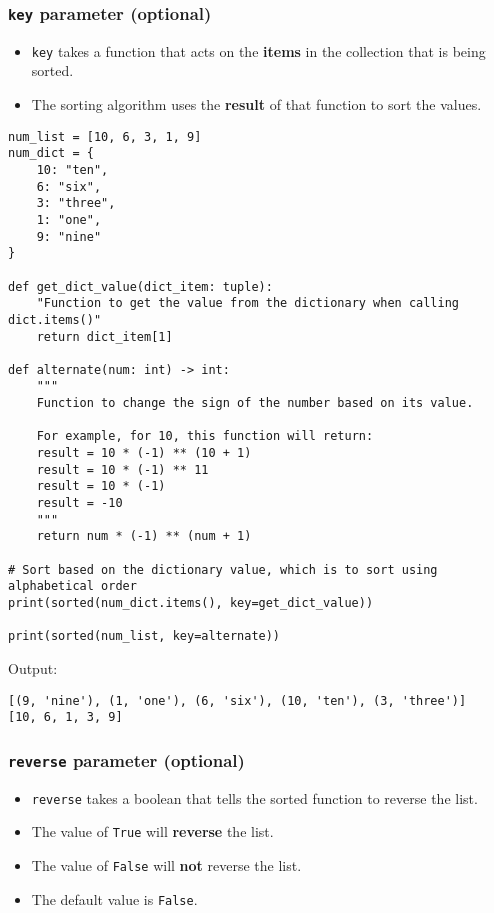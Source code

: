 \documentclass[11pt]{article}
\begin{document}
 \newpage

\subsubsection{\texttt{key} parameter (optional)}
\label{sec:org59bed96}
\begin{itemize}
\item \texttt{key} takes a function that acts on the \textbf{items} in the collection that is being sorted.
\item The sorting algorithm uses the \textbf{result} of that function to sort the values.
\end{itemize}

\begin{verbatim}
num_list = [10, 6, 3, 1, 9]
num_dict = {
    10: "ten",
    6: "six",
    3: "three",
    1: "one",
    9: "nine"
}

def get_dict_value(dict_item: tuple):
    "Function to get the value from the dictionary when calling dict.items()"
    return dict_item[1]

def alternate(num: int) -> int:
    """
    Function to change the sign of the number based on its value.

    For example, for 10, this function will return:
    result = 10 * (-1) ** (10 + 1)
    result = 10 * (-1) ** 11
    result = 10 * (-1)
    result = -10
    """
    return num * (-1) ** (num + 1)

# Sort based on the dictionary value, which is to sort using alphabetical order
print(sorted(num_dict.items(), key=get_dict_value))

print(sorted(num_list, key=alternate))
\end{verbatim}

 \noindent Output:

\begin{verbatim}
[(9, 'nine'), (1, 'one'), (6, 'six'), (10, 'ten'), (3, 'three')]
[10, 6, 1, 3, 9]
\end{verbatim}

\subsubsection{\texttt{reverse} parameter (optional)}
\label{sec:org70cd256}
\begin{itemize}
\item \texttt{reverse} takes a boolean that tells the sorted function to reverse the list.
\item The value of \texttt{True} will \textbf{reverse} the list.
\item The value of \texttt{False} will \textbf{not} reverse the list.
\item The default value is \texttt{False}.
\end{itemize}
\end{document}
